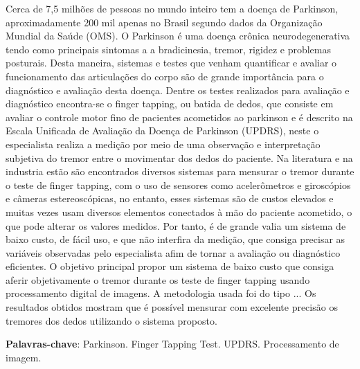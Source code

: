 \documentclass[
	12pt,				%
	openany,			%
	oneside,			%
	a4paper,			%
	english,			%
	french,				%
	spanish,			%
	brazil				%
	]{abntex2}
\begin{document}
\setlength{\absparsep}{18pt} %
\begin{resumo}

Cerca de 7,5 milhões de pessoas no mundo inteiro tem a doença de Parkinson, aproximadamente 200 mil apenas no Brasil
segundo dados da Organização Mundial da Saúde (OMS). O Parkinson é uma doença crônica neurodegenerativa tendo como
principais sintomas a a bradicinesia, tremor, rigidez e problemas posturais. Desta maneira, sistemas e testes que venham quantificar e avaliar o funcionamento das articulações do corpo são de grande importância para o diagnóstico e avaliação desta doença. Dentre os testes realizados para avaliação e diagnóstico encontra-se o finger tapping, ou batida de dedos, que consiste em avaliar o controle motor fino de pacientes acometidos ao parkinson e é descrito na Escala Unificada de Avaliação da Doença de Parkinson (UPDRS), neste o especialista realiza a medição por meio de uma observação e interpretação subjetiva do tremor entre o movimentar dos dedos do paciente. Na literatura e na industria estão são encontrados diversos sistemas para mensurar o tremor durante o teste de finger tapping, com o uso de sensores como acelerômetros e giroscópios e câmeras estereoscópicas, no entanto, esses sistemas são de custos elevados e muitas vezes usam diversos elementos conectados à mão do paciente acometido, o que pode alterar os valores medidos. Por tanto, é de grande valia um sistema de baixo custo, de fácil uso, e que não interfira da medição, que consiga precisar as variáveis observadas pelo especialista afim de tornar a avaliação ou diagnóstico eficientes. O objetivo principal propor um sistema de baixo custo que consiga aferir objetivamente o tremor durante os teste de finger tapping usando processamento digital de imagens. A metodologia usada foi do tipo ... Os resultados obtidos mostram que é possível mensurar com excelente precisão os tremores dos dedos utilizando o sistema proposto.


\textbf{Palavras-chave}: Parkinson. Finger Tapping Test. UPDRS. Processamento de imagem.
\end{resumo}
\end{document}
